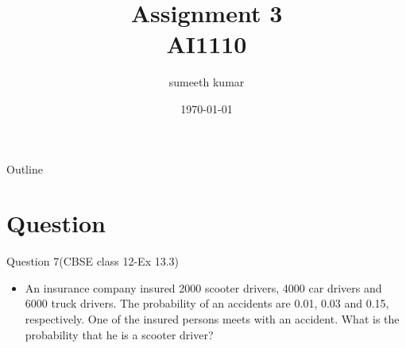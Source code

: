 \documentclass{beamer}
\title{Assignment 3 \\
 AI1110}
\author{sumeeth kumar}
\date{\today}
\begin{document}
\begin{frame}
    \titlepage 
\end{frame}

\logo{}


\begin{frame}{Outline}
    \tableofcontents
\end{frame}


\section{Question}
\begin{frame}{Question 7(CBSE class 12-Ex 13.3)}


\begin{itemize}
    \item An insurance company insured 2000 scooter drivers, 4000 car drivers and 6000 truck drivers. The probability of an accidents are 0.01, 0.03 and 0.15, respectively. One of the insured persons meets with an accident. What is the probability that he is a scooter driver?\\
\end{itemize}
\end{frame}
\end{document}
